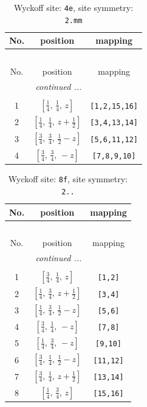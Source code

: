 \documentclass[fleqn,8pt]{jsarticle}
\begin{document}
\renewcommand{\arraystretch}{1.2}
\begin{longtable}{ccc}
\caption{Wyckoff site: {\tt 4e}, site symmetry: {\tt 2.mm}}
 \\
 \hline \hline
No. & position & mapping \\ \hline \endfirsthead

\multicolumn{2}{l}{\tablename\ \thetable{}} \\
 \hline \hline
No. & position & mapping \\ \hline \endhead

 \hline \hline
\multicolumn{2}{r}{\footnotesize\it continued ...} \\ \endfoot

 \hline \hline
\multicolumn{2}{r}{} \\ \endlastfoot

1 & $\left[ \frac{1}{4},\, \frac{1}{4},\, z \right]$ & {\tt [1,2,15,16]} \\ \hline
2 & $\left[ \frac{1}{4},\, \frac{1}{4},\, z + \frac{1}{2} \right]$ & {\tt [3,4,13,14]} \\ \hline
3 & $\left[ \frac{3}{4},\, \frac{3}{4},\, \frac{1}{2} - z \right]$ & {\tt [5,6,11,12]} \\ \hline
4 & $\left[ \frac{3}{4},\, \frac{3}{4},\, - z \right]$ & {\tt [7,8,9,10]} \\
\end{longtable}
\renewcommand{\arraystretch}{1.2}
\begin{longtable}{ccc}
\caption{Wyckoff site: {\tt 8f}, site symmetry: {\tt 2..}}
 \\
 \hline \hline
No. & position & mapping \\ \hline \endfirsthead

\multicolumn{2}{l}{\tablename\ \thetable{}} \\
 \hline \hline
No. & position & mapping \\ \hline \endhead

 \hline \hline
\multicolumn{2}{r}{\footnotesize\it continued ...} \\ \endfoot

 \hline \hline
\multicolumn{2}{r}{} \\ \endlastfoot

1 & $\left[ \frac{3}{4},\, \frac{1}{4},\, z \right]$ & {\tt [1,2]} \\ \hline
2 & $\left[ \frac{1}{4},\, \frac{3}{4},\, z + \frac{1}{2} \right]$ & {\tt [3,4]} \\ \hline
3 & $\left[ \frac{1}{4},\, \frac{3}{4},\, \frac{1}{2} - z \right]$ & {\tt [5,6]} \\ \hline
4 & $\left[ \frac{3}{4},\, \frac{1}{4},\, - z \right]$ & {\tt [7,8]} \\ \hline
5 & $\left[ \frac{1}{4},\, \frac{3}{4},\, - z \right]$ & {\tt [9,10]} \\ \hline
6 & $\left[ \frac{3}{4},\, \frac{1}{4},\, \frac{1}{2} - z \right]$ & {\tt [11,12]} \\ \hline
7 & $\left[ \frac{3}{4},\, \frac{1}{4},\, z + \frac{1}{2} \right]$ & {\tt [13,14]} \\ \hline
8 & $\left[ \frac{1}{4},\, \frac{3}{4},\, z \right]$ & {\tt [15,16]} \\
\end{longtable}
\end{document}

